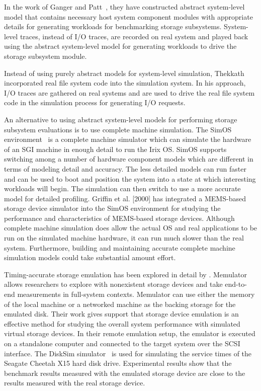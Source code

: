 In the work of Ganger and Patt~\cite{Ganger:1998}, they have constructed abstract system-level model that contains necessary host system component modules with appropriate details for generating workloads for benchmarking storage subsystems. System-level traces, instead of I/O traces, are recorded on real system and played back using the abstract system-level model for generating workloads to drive the storage subsystem module.

Instead of using purely abstract models for system-level simulation, Thekkath~\cite{Thekkath:1994} incorporated real file system code into the simulation system. In his approach, I/O traces are gathered on real systems and are used to drive the real file system code in the simulation process for generating I/O requests.

An alternative to using abstract system-level models for performing storage subsystem evaluations is to use complete machine simulation. The SimOS environment~\cite{Rosenblum:1995} \cite{Witchel:1996} \cite{Rosenblum:1997} is a complete machine simulator which can simulate the hardware of an SGI machine in enough detail to run the Irix OS. SimOS supports switching among a number of hardware component models which are different in terms of modeling detail and accuracy. The less detailed models can run faster and can be used to boot and position the system into a state at which interesting workloads will begin. The simulation can then switch to use a more accurate model for detailed profiling. Griffin et al. [2000] has integrated a MEMS-based storage device simulator into the SimOS environment for studying the performance and characteristics of MEMS-based storage devices. Although complete machine simulation does allow the actual OS and real applications to be run on the simulated machine hardware, it can run much slower than the real system. Furthermore, building and maintaining accurate complete machine simulation models could take substantial amount effort.

Timing-accurate storage emulation has been explored in detail by \cite{Griffin:2002}. Memulator allows researchers to explore with nonexistent storage devices and take end-to-end measurements in full-system contexts. Memulator can use either the memory of the local machine or a networked machine as the backing storage for the emulated disk. Their work gives support that storage device emulation is an effective method for studying the overall system performance with simulated virtual storage devices. In their remote emulation setup, the emulator is executed on a standalone computer and connected to the target system over the SCSI interface. The DiskSim simulator~\cite{Bucy:2008} is used for simulating the service times of the Seagate Cheetah X15 hard disk drive. Experimental results show that the benchmark results measured with the emulated storage device are close to the results measured with the real storage device.

